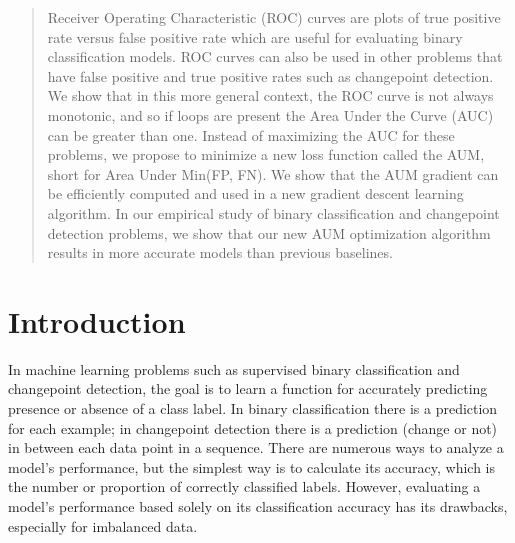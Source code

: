 \documentclass{article}
\begin{document}

\begin{abstract}
Receiver Operating Characteristic (ROC) curves are plots of true positive rate versus false positive rate which are useful for evaluating binary classification models.
ROC curves can also be used in other problems that have false positive and true positive rates such as changepoint detection.
We show that in this more general context, the ROC curve is not always monotonic, and so if loops are present the Area Under the Curve (AUC) can be greater than one.
Instead of maximizing the AUC for these problems, we propose to minimize a new loss function called the AUM, short for Area Under Min(FP, FN).
We show that the AUM gradient can be efficiently computed and used in a new gradient descent learning algorithm.
In our empirical study of binary classification and changepoint detection problems, we show that our new AUM optimization algorithm results in more accurate models than previous baselines.
\end{abstract}

\section{Introduction}
\label{sec:introduction}
In machine learning problems such as supervised binary classification and changepoint detection, the goal is to learn a function for accurately predicting presence or absence of a class label.
In binary classification there is a prediction for each example; in changepoint detection there is a prediction (change or not) in between each data point in a sequence.
There are numerous ways to analyze a model's performance, but the simplest way is to calculate its accuracy, which is the number or proportion of correctly classified labels.
However, evaluating a model's performance based solely on its classification accuracy has its drawbacks, especially for imbalanced data.
\end{document}

